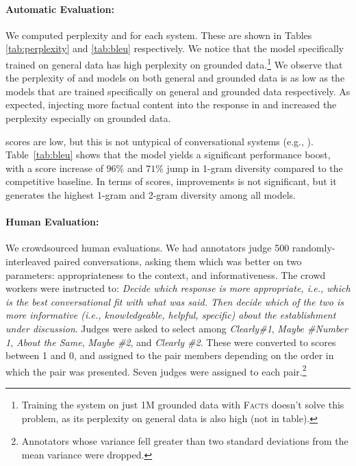 \documentclass[letterpaper]{article}
\begin{document}
\paragraph{Automatic Evaluation:}
We computed perplexity and \bleu \cite{Papineni2002BLEU} for each system. These are shown in Tables \ref{tab:perplexity} and \ref{tab:bleu} respectively. We notice that the \sts model specifically trained on general data has high perplexity on grounded data.\footnote{Training the system on just 1M grounded data with \textsc{Facts} doesn't solve this problem, as its perplexity on general data is also high (not in table).}
We observe that the perplexity of \MTask and \MTaskR models on both general and grounded data is as low as the \sts models that are trained specifically on general and grounded data respectively. As expected, injecting more factual content into the response in  \MTaskF and \MTaskRF increased the perplexity especially on grounded data.

\bleu scores are low, but this is not untypical of conversational systems (e.g., \cite{li2016diversity,li2016persona}). Table~\ref{tab:bleu} shows that the \MTaskR model yields
a significant performance boost, with a \bleu score increase of $96\%$ and $71\%$ jump in 1-gram diversity compared to the competitive \sts baseline. In terms of \bleu scores, \MTaskRF improvements is not significant, but it generates the highest 1-gram and 2-gram diversity among all models.

\paragraph{Human Evaluation:} We crowdsourced human evaluations. We had annotators judge 500 randomly-interleaved paired conversations, asking them which was better on two parameters: appropriateness to the  context, and informativeness. The crowd workers were instructed to: \textit{Decide which response is more appropriate, i.e., which is the best conversational fit with what was said. Then decide which of the two is more informative (i.e., knowledgeable, helpful, specific) about the establishment under discussion}.
Judges were asked to select among \textit{Clearly{\#}1}, \textit{Maybe {\#}Number 1}, \textit{About the Same}, \textit{Maybe {\#}2}, and \textit{Clearly {\#}2}. These were converted to scores between 1 and 0, and assigned to the pair members depending on the order in which the pair was presented.
Seven judges were assigned to each pair.\footnote{Annotators whose variance fell greater than two standard deviations from the mean variance were dropped.}
\end{document}
